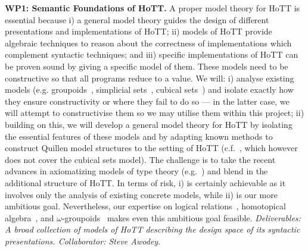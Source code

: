 \documentclass[a4paper,11pt]{article}
\begin{document}
{\bf WP1: Semantic Foundations of HoTT.}  A proper model theory for
HoTT is essential because i) a general model theory guides the design
of different presentations and implementations of HoTT; ii) models of
HoTT provide algebraic techniques to reason about the correctness of
implementations which complement syntactic techniques; and iii)
specific implementations of HoTT can be proven sound by giving a
specific model of them.  These models need to be constructive so that
all programs reduce to a value.
We will: i) analyse existing
models ({e.g.}  groupoids~\cite{HofmannM:groitt}, simplicial
sets~\cite{KapulkinC:simmuv}, cubical sets~\cite{BezemM:cubsmt}) and
isolate exactly how they ensure constructivity or where they fail to
do so --- in the latter case, we will attempt to constructivise them
so we may utilise them within this project;
ii) building on this, we will develop a general model theory for HoTT
by isolating the essential features of these models and by adapting
known methods to construct Quillen model structures to the setting of
HoTT ({c.f.}~\cite{ShulmanM:uniidh}, which however does not cover the
cubical sets model).  The challenge is to take the recent advances in
axiomatizing models of type theory ({e.g.}~\cite{AwodeyS:natmtt}) and
blend in the additional structure of HoTT. In terms of risk, i) is
certainly achievable as it involves only the analysis of existing
concrete models, while ii) is our more ambitious goal. Nevertheless, our
expertise on logical relations~\cite{neil2014relParamDep},
homotopical algebra~\cite{GambinoN:homl2c,GambinoN:weilsh}, and
$\omega$-groupoids~\cite{alti:csl12,alti:tlca13-hedberg} makes even this ambitious goal
feasible. {\em Deliverables: A broad collection of models of HoTT
  describing the design space of its syntactic presentations.
  Collaborator: Steve Awodey.  }
\end{document}
